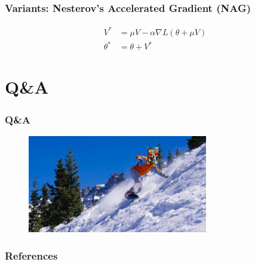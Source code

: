 \documentclass{beamer}
\begin{document}
\begin{frame}
  \frametitle{Variants: Nesterov's Accelerated Gradient (NAG)}
  \begin{align*}
    V^{*}&=\mu V-\alpha\nabla L(\theta+\mu V) \\
    \theta^{*}&=\theta+V^{*}
  \end{align*}
\end{frame}

\section*{Q\&A}

\begin{frame}
  \frametitle{Q\&A}
  \begin{figure}
    \centering
    \includegraphics[width=0.7\textwidth]{gradient_descent.jpg}
  \end{figure}
\end{frame}


\begin{frame}[allowframebreaks]
\frametitle{References}
\footnotesize


\end{frame}
\end{document}
